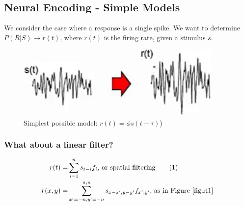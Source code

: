 \documentclass[]{article}
\newcommand\numberthis{\addtocounter{equation}{1}\tag{\theequation}}
\begin{document}
\subsection{Neural Encoding - Simple Models}

We  consider the case where a response is a single spike. We want to determine $P(R\vert S) \rightarrow r(t)$, where $r(t)$ is the firing rate, given a stimulus $s$.

\begin{figure}[H]
	\begin{center}
		\caption{Simplest possible model: $r(t) = \phi s(t-\tau)$)}
		\includegraphics[width=0.9\textwidth]{simplest-model}
	\end{center}
\end{figure}

\subsubsection{What about a linear filter?}

\begin{align*}
	r(t) =& \sum_{i=1}^{n} s_{t-i} f_i \text{, or spatial filtering} \numberthis \label{eq:linear:filter}\\
	r(x,y) =& \sum_{x^\prime=-n,y^\prime=-n}^{n,n}s_{x-x^\prime,y-y^\prime} f_{x^\prime,y^\prime} \text{, as in Figure \ref{fig:rf1}}
\end{align*}
\end{document}

